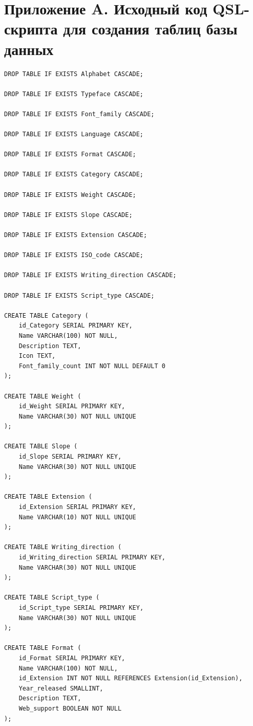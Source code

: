 \section*{Приложение A. Исходный код QSL-скрипта для создания таблиц базы данных}

\renewcommand{\theFancyVerbLine}{%
    \scriptsize\ttfamily\textcolor{gray}{\arabic{FancyVerbLine}}%
}

\begin{verbatim}
DROP TABLE IF EXISTS Alphabet CASCADE;

DROP TABLE IF EXISTS Typeface CASCADE;

DROP TABLE IF EXISTS Font_family CASCADE;

DROP TABLE IF EXISTS Language CASCADE;

DROP TABLE IF EXISTS Format CASCADE;

DROP TABLE IF EXISTS Category CASCADE;

DROP TABLE IF EXISTS Weight CASCADE;

DROP TABLE IF EXISTS Slope CASCADE;

DROP TABLE IF EXISTS Extension CASCADE;

DROP TABLE IF EXISTS ISO_code CASCADE;

DROP TABLE IF EXISTS Writing_direction CASCADE;

DROP TABLE IF EXISTS Script_type CASCADE;

CREATE TABLE Category (
    id_Category SERIAL PRIMARY KEY,
    Name VARCHAR(100) NOT NULL,
    Description TEXT,
    Icon TEXT,
    Font_family_count INT NOT NULL DEFAULT 0
);

CREATE TABLE Weight (
    id_Weight SERIAL PRIMARY KEY,
    Name VARCHAR(30) NOT NULL UNIQUE
);

CREATE TABLE Slope (
    id_Slope SERIAL PRIMARY KEY,
    Name VARCHAR(30) NOT NULL UNIQUE
);

CREATE TABLE Extension (
    id_Extension SERIAL PRIMARY KEY,
    Name VARCHAR(10) NOT NULL UNIQUE
);

CREATE TABLE Writing_direction (
    id_Writing_direction SERIAL PRIMARY KEY,
    Name VARCHAR(30) NOT NULL UNIQUE
);

CREATE TABLE Script_type (
    id_Script_type SERIAL PRIMARY KEY,
    Name VARCHAR(30) NOT NULL UNIQUE
);

CREATE TABLE Format (
    id_Format SERIAL PRIMARY KEY,
    Name VARCHAR(100) NOT NULL,
    id_Extension INT NOT NULL REFERENCES Extension(id_Extension),
    Year_released SMALLINT,
    Description TEXT,
    Web_support BOOLEAN NOT NULL
);


\end{verbatim}
